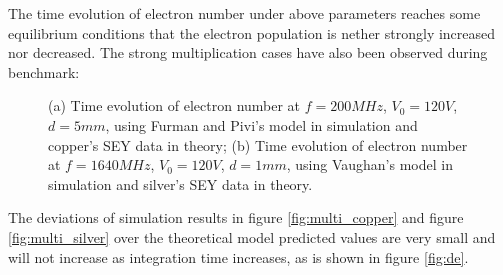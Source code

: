 \documentclass[aps,prstab,superscriptaddress,showpacs]{revtex4-1}
\begin{document}
The time evolution of electron number under above parameters reaches some equilibrium conditions that the electron population is nether strongly increased nor decreased. The strong multiplication cases have also been observed during benchmark:
\begin{figure}[H] 
  \caption{(a) Time evolution of electron number at $f=200MHz$, $V_0=120V$, $d=5mm$, using Furman and Pivi's model in simulation and copper's SEY data in theory; (b) Time evolution of electron number at $f=1640MHz$, $V_0=120V$, $d=1mm$, using Vaughan's model in simulation and silver's SEY data in theory.} 
  \label{fig:mini:subfig} %
\end{figure}

The deviations of simulation results in figure \ref{fig:multi_copper} and figure \ref{fig:multi_silver} over the theoretical model predicted values are very small and will not increase as integration time increases, as is shown in figure \ref{fig:de}.
\end{document}
